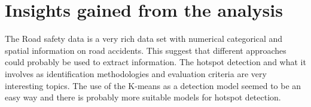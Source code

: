 \documentclass{article}
\begin{document}
\section{Insights gained from the analysis}


The Road safety data is a very rich data set with numerical categorical and spatial information on road accidents. This suggest that different approaches could probably be used to extract information.
The hotspot detection and what it involves as identification methodologies and evaluation criteria are very interesting topics. The use of the K-means as a detection model seemed to be an easy way and there is probably more suitable models for hotspot detection.










%
%
\end{document}
